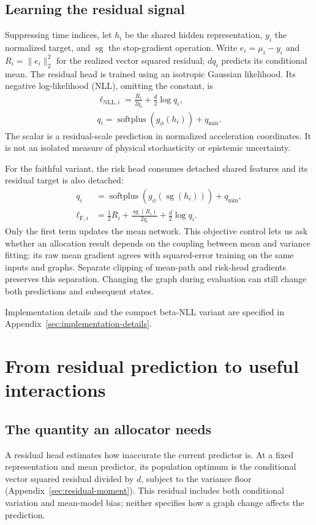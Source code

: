 \subsection{Learning the residual signal}
Suppressing time indices, let $h_i$ be the shared hidden representation, $y_i$ the normalized target, and $\operatorname{sg}$ the stop-gradient operation. Write $e_i=\mu_i-y_i$ and $R_i=\|e_i\|_2^2$ for the realized vector squared residual; $dq_i$ predicts its conditional mean. The residual head is trained using an isotropic Gaussian likelihood. Its negative log-likelihood (NLL), omitting the constant, is
\begin{align}
 \ell_{\mathrm{NLL},i}=\frac{R_i}{2q_i}+\frac d2\log q_i,\nonumber\\
 q_i=\operatorname{softplus}(g_\phi(h_i))+q_{\min}.
 \label{eq:nll}
\end{align}
The scalar is a residual-scale prediction in normalized acceleration coordinates. It is not an isolated measure of physical stochasticity or epistemic uncertainty.

For the faithful variant, the risk head consumes detached shared features and its residual target is also detached:
\begin{align}
 q_i&=\operatorname{softplus}(g_\phi(\operatorname{sg}(h_i)))+q_{\min},\nonumber\\
 \ell_{\mathrm F,i}&=\tfrac12R_i+
 \frac{\operatorname{sg}(R_i)}{2q_i}+\frac d2\log q_i.
 \label{eq:faithful}
\end{align}
Only the first term updates the mean network. This objective control lets us ask whether an allocation result depends on the coupling between mean and variance fitting: its raw mean gradient agrees with squared-error training on the same inputs and graphs. Separate clipping of mean-path and risk-head gradients preserves this separation. Changing the graph during evaluation can still change both predictions and subsequent states.

Implementation details and the compact beta-NLL variant are specified in Appendix~\ref{sec:implementation-details}.

\section{From residual prediction to useful interactions}
\subsection{The quantity an allocator needs}
A residual head estimates how inaccurate the current predictor is. At a fixed representation and mean predictor, its population optimum is the conditional vector squared residual divided by $d$, subject to the variance floor (Appendix~\ref{sec:residual-moment}). This residual includes both conditional variation and mean-model bias; neither specifies how a graph change affects the prediction.

